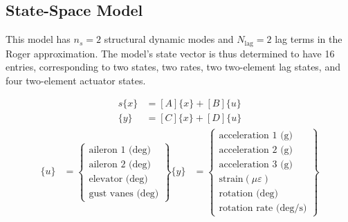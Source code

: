 \begin{landscape}

\chapter{State-Space Model}
\label{ap:optSS}

This model has $n_s=2$ structural dynamic modes and $N_\text{lag}=2$ lag terms in the Roger approximation. The model's state vector is thus determined to have 16 entries, corresponding to two states, two rates, two two-element lag states, and four two-element actuator states.

\begin{align*}
	s\{x\} &= [A]\{x\} + [B]\{u\} \\
	\{y\} &= [C]\{x\} + [D]\{u\}
\end{align*}
\begin{align*}
	\{u\} &= \begin{Bmatrix}
		\text{aileron 1 (deg)} \\
		\text{aileron 2 (deg)} \\
		\text{elevator (deg)} \\
		\text{gust vanes (deg)}
	\end{Bmatrix}
	\{y\} &= \begin{Bmatrix}
		\text{acceleration 1 (g)} \\
		\text{acceleration 2 (g)} \\
		\text{acceleration 3 (g)} \\
		\text{strain} (\mu\varepsilon) \\
		\text{rotation (deg)} \\
		\text{rotation rate (deg/s)}
	\end{Bmatrix}
\end{align*}


\end{landscape}
